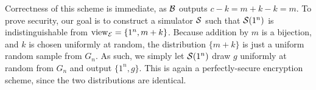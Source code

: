 Correctness of this scheme is immediate, as $\mathcal{B}$ outputs $c - k = m + k - k =
m$. To prove security, our goal is to construct a simulator $\mathcal{S}$ such that
$\mathcal{S}(1^n)$ is indistinguishable from $\operatorname{view}_{\mathcal{E}} = \{1^n, m + k\}$. Because
addition by $m$ is a bijection, and $k$ is chosen uniformly at random, the
distribution $\{m + k\}$ is just a uniform random sample from $G_n$. As such, we
simply let $\mathcal{S}(1^n)$ draw $g$ uniformly at random from $G_n$ and output $\{1^n,
g\}$. This is again a perfectly-secure encryption scheme, since the two
distributions are identical.



